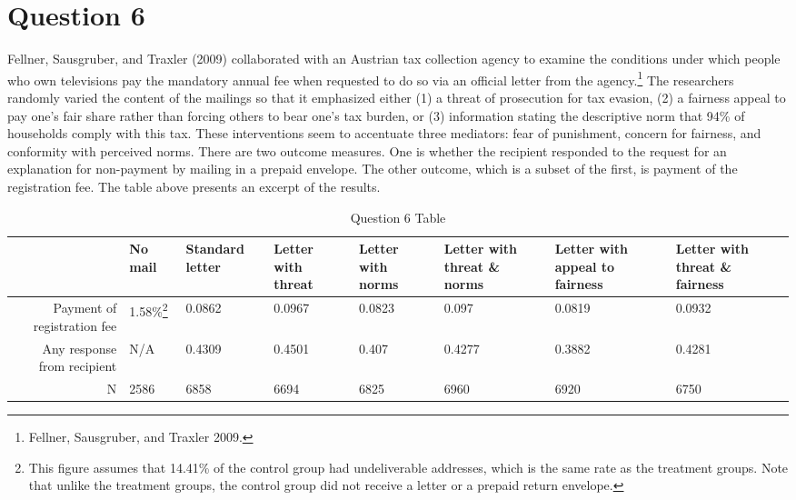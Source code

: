 \documentclass[11pt,notitlepage]{article}\usepackage[]{graphicx}\usepackage[]{color}
\begin{document}
\section*{Question 6}
Fellner, Sausgruber, and Traxler (2009) collaborated with an Austrian tax collection agency to examine the conditions under which people who own televisions pay the mandatory annual fee when requested to do so via an official letter from the agency.\footnote{Fellner, Sausgruber, and Traxler 2009.} The researchers randomly varied the content of the mailings so that it emphasized either (1) a threat of prosecution for tax evasion, (2) a fairness appeal to pay one's fair share rather than forcing others to bear one's tax burden, or (3) information stating the descriptive norm that 94\% of households comply with this tax. These interventions seem to accentuate three mediators: fear of punishment, concern for fairness, and conformity with perceived norms. There are two outcome measures. One is whether the recipient responded to the request for an explanation for non-payment by mailing in a prepaid envelope. The other outcome, which is a subset of the first, is payment of the registration fee. The table above presents an excerpt of the results.


\begin{table}[H]
  \centering
  \caption{Question 6 Table}
    \begin{tabular}{rC{1.5cm}C{1.5cm}C{1.5cm}C{1.5cm}C{1.5cm}C{1.5cm}C{1.5cm}}
    \toprule
          & No mail  & Standard letter  & Letter with threat  & Letter with norms  & Letter with threat \& norms  & Letter with appeal to fairness  & Letter with threat \& fairness  \\
    \midrule
    Payment of registration fee  & 1.58\%\footnote{This figure assumes that 14.41\% of the control group had undeliverable addresses, which is the same rate as the treatment groups. Note that unlike the treatment groups, the control group did not receive a letter or a prepaid return envelope.}  & 0.0862 & 0.0967 & 0.0823 & 0.097 & 0.0819 & 0.0932 \\
    Any response from recipient  & N/A   & 0.4309 & 0.4501 & 0.407 & 0.4277 & 0.3882 & 0.4281 \\
    N     & 2586  & 6858  & 6694  & 6825  & 6960  & 6920  & 6750 \\
    \bottomrule
    \end{tabular}%
  \label{tab:addlabel}%
\end{table}%
\end{document}
